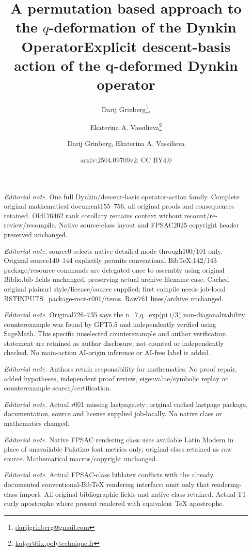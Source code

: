 \documentclass[revision]{FPSAC2025}
\title{A permutation based approach to the $q$-deformation of the Dynkin Operator}
\author[D. Grinberg \and E.A. Vassilieva]{Darij Grinberg\thanks{\href{mailto:darijgrinberg@gmail.com}{darijgrinberg@gmail.com}}\addressmark{1}, \and Ekaterina A. Vassilieva\thanks{\href{mailto:katya@lix.polytechnique.fr}{katya@lix.polytechnique.fr}}\addressmark{2}}
\title{Explicit descent-basis action of the q-deformed Dynkin operator}
\author{Darij Grinberg, Ekaterina A. Vassilieva}
\date{arxiv:2504.09709v2; CC BY4.0}
\begin{document}
\maketitle
\noindent\textit{Editorial note.} One full Dynkin/descent-basis operator-action family. Complete original mathematical document155--756, all original proofs and consequences retained. Old176462 rank corollary remains context without recount/re-review/recompile. Native source-class layout and FPSAC2025 copyright header preserved unchanged.\par\medskip
\noindent\textit{Editorial note.} source0 selects native detailed mode through100/101 only. Original source140--144 explicitly permits conventional BibTeX;142/143 package/resource commands are delegated once to assembly using original Biblio.bib fields unchanged, preserving actual archive filename case. Cached original plainurl style/license/source supplied; first compile needs job-local BSTINPUTS=package-root-r001/items. Raw761 lines/archive unchanged.\par\medskip
\noindent\textit{Editorial note.} Original726--735 says the n=7,q=exp(pi i/3) non-diagonalizability counterexample was found by GPT5.5 and independently verified using SageMath. This specific unselected counterexample and author verification statement are retained as author disclosure, not counted or independently checked. No main-action AI-origin inference or AI-free label is added.\par\medskip
\noindent\textit{Editorial note.} Authors retain responsibility for mathematics. No proof repair, added hypotheses, independent proof review, eigenvalue/symbolic replay or counterexample search/certification.\par\medskip
\noindent\textit{Editorial note.} Actual r001 missing lastpage.sty: original cached lastpage package, documentation, source and license supplied job-locally. No native class or mathematics changed.\par\medskip
\noindent\textit{Editorial note.} Native FPSAC rendering class uses available Latin Modern in place of unavailable Palatino font metrics only; original class retained as raw source. Mathematical macros/copyright unchanged.\par\medskip
\noindent\textit{Editorial note.} Actual FPSAC-class biblatex conflicts with the already documented conventional-BibTeX rendering interface: omit only that rendering-class import. All original bibliographic fields and native class retained. Actual T1 curly apostrophe where present rendered with equivalent TeX apostrophe.\par\medskip
\end{document}
